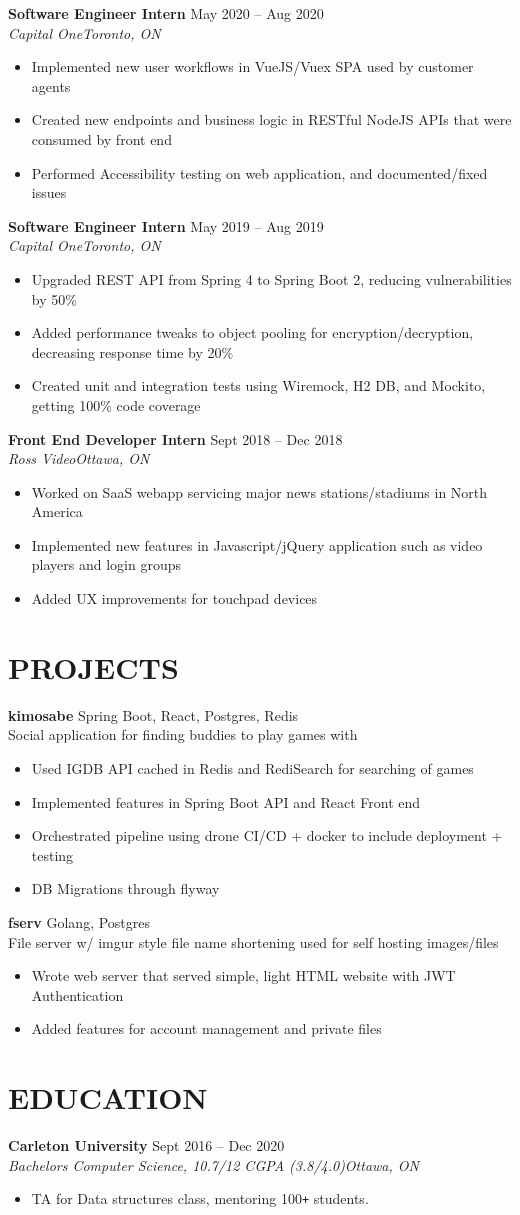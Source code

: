 \documentclass[letterpaper]{article}
\newcommand{\NewPart}[1]{\section*{\large\uppercase{\textbf{#1}}}}
\newcommand{\DatedEntry}[5]{\small\textbf{#1}
	\hfill \small{#2}\\
	\textit{#3}\hfill\textit{#4}\\\vspace{0.1cm}
	#5\vspace{0.1cm}
}
\newcommand{\ProjectEntry}[4]{\textbf{#1}
	\hfill \small{#2}\\
	#3\\\vspace{0.1cm}
	#4\vspace{0.1cm}
}
\begin{document}
\DatedEntry{Software Engineer Intern}
{May 2020 -- Aug 2020}
{Capital One}
{Toronto, ON}
{\begin{itemize}[nolistsep]
	\item Implemented new user workflows in VueJS/Vuex SPA used by customer agents
	\item Created new endpoints and business logic in RESTful NodeJS APIs that were consumed by front end
	\item Performed Accessibility testing on web application, and documented/fixed issues
\end{itemize}}
\DatedEntry{Software Engineer Intern}
{May 2019 -- Aug 2019}
{Capital One}
{Toronto, ON}
{\begin{itemize}[nolistsep]
	\item Upgraded REST API from Spring 4 to Spring Boot 2, reducing vulnerabilities by 50\%
	\item Added performance tweaks to object pooling for encryption/decryption, decreasing response time by 20\%
	\item Created unit and integration tests using Wiremock, H2 DB, and Mockito, getting 100\% code coverage
\end{itemize}}
\DatedEntry{Front End Developer Intern}
{Sept 2018 -- Dec 2018}
{Ross Video}
{Ottawa, ON}
{\begin{itemize}[nolistsep]
	\item Worked on SaaS webapp servicing major news stations/stadiums in North America
	\item Implemented new features in Javascript/jQuery application such as video players and login groups
	\item Added UX improvements for touchpad devices
\end{itemize}}
\vspace{-0.3cm}

\NewPart{Projects}
\ProjectEntry{kimosabe}
{Spring Boot, React, Postgres, Redis}
{Social application for finding buddies to play games with}
{\begin{itemize}
	\item Used IGDB API cached in Redis and RediSearch for searching of games
	\item Implemented features in Spring Boot API and React Front end
	\item Orchestrated pipeline using drone CI/CD + docker to include deployment + testing
	\item DB Migrations through flyway
\end{itemize}}
\ProjectEntry{fserv}
{Golang, Postgres}
{File server w/ imgur style file name shortening used for self hosting images/files}
{\begin{itemize}
	\item Wrote web server that served simple, light HTML website with JWT Authentication
	\item Added features for account management and private files
\end{itemize}}\vspace{-0.3cm}

\NewPart{Education}
\DatedEntry{Carleton University}
{Sept 2016 -- Dec 2020}
{Bachelors Computer Science, 10.7/12 CGPA (3.8/4.0)}
{Ottawa, ON}
{\begin{itemize}
	\item TA for Data structures class, mentoring 100\texttt{+} students.
\end{itemize}}
\end{document}
